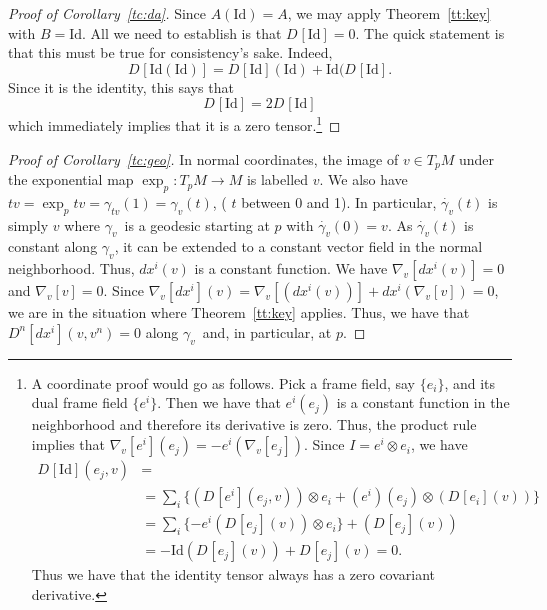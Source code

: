 \documentclass[11pt]{article}
\theoremstyle{remark}
\begin{document}
\begin{proof}[Proof of Corollary~\ref{tc:da}]
Since $A(\ensuremath{\text{Id}}) = A$, we may apply Theorem~\ref{tt:key} with $B=\text{Id}$.  
All we need to establish
is that $\ensuremath{D^{} [{\text{Id}}] {} } =0 $. The quick statement is that this
must be true for consistency's sake. Indeed, 
\[\ensuremath{D^{} [{\ensuremath{\text{Id}}(\ensuremath{\text{Id}})}] {} } = \ensuremath{D^{} [{\ensuremath{\text{Id}}}] ({\ensuremath{\text{Id}}}) } + \ensuremath{\text{Id}}(\ensuremath{D^{} [{\ensuremath{\text{Id}}}] {} }.\]
Since it is the identity, this says that 
\[\ensuremath{D^{} [{\ensuremath{\text{Id}}}] {} } = 2 \ensuremath{D^{} [{\ensuremath{\text{Id}}}] {} }\]
which immediately implies that it is a zero 
tensor.\footnote{A coordinate proof would go as follows. Pick a frame
  field, say 
 $\{e_i\}$,  and its dual frame field $\{e^i\}$. Then we
have that $e^i(e_j)$ is a constant function in the neighborhood and
therefore its 
derivative is zero. Thus, the product rule implies that
$\ensuremath{{{\nabla}}_{v}^{}{[e^i]}}(e_j) = -e^i(\ensuremath{{{\nabla}}_{v}^{}{[e_j]}})$. Since 
 $I = e^i \otimes e_i$, we have 
\begin{align*}
\ensuremath{D^{} [{\ensuremath{\text{Id}}}] ({e_j, v}) } & = \\
& = \sum_i\{ (\ensuremath{D^{} [{e^i}] ({e_j, v}) }) \otimes e_i + 
(e^i)(e_j) \otimes (\ensuremath{D^{} [{e_i}] ({v}) })\} \\
& = \sum_i\{-e^i(\ensuremath{D^{} [{e_j}] ({v}) }) \otimes {e_i}\} +
 (\ensuremath{D^{} [{e_j}] ({v}) }) \\
& = - \ensuremath{\text{Id}}(\ensuremath{D^{} [{e_j}] ({v}) }) + \ensuremath{D^{} [{e_j}] ({v}) } = 0.
\end{align*}
Thus we have that the identity tensor always has a zero covariant
derivative.}
\end{proof}


\begin{proof}[Proof of Corollary~\ref{tc:geo}]
In normal coordinates, the image of $v \in T_p M$ under the
exponential map $\ensuremath{\exp_{p}{}} : T_p M \to M$ is labelled $v$. 
We also have 
$tv = \ensuremath{\exp_{p}{tv}}= \gamma_{tv}(1) = \gamma_{v}(t)$,  
( $t$ between 0 and 1). 
In particular, \ensuremath{{\overset{\cdot}{\gamma}}_{v}({t})} is simply $v$ where \ensuremath{\gamma_v}\ is a geodesic
starting at $p$ with $\ensuremath{{\overset{\cdot}{\gamma}}_{v}({0})} = v$.  
As \ensuremath{{\overset{\cdot}{\gamma}}_{v}({t})} is constant along \ensuremath{\gamma_v}, it can be extended to a
constant vector field in
the normal neighborhood. Thus, $dx^i(v)$ is a constant
function. We have $\ensuremath{{{\nabla}}_{v}^{}{[dx^i(v)]}} = 0 $ and $\ensuremath{{{\nabla}}_{v}^{}{[v]}}
=0$. Since $\ensuremath{{{\nabla}}_{v}^{}{[dx^i]}} (v) =  
\ensuremath{{{\nabla}}_{v}^{}{[(dx^i(v))]}} + dx^i(\ensuremath{{{\nabla}}_{v}^{}{[v]}})=0$, we are in the
situation where Theorem~\ref{tt:key} applies. Thus, we have that
$\ensuremath{D^{n} [{dx^i}] ({v, v^n}) } = 0$ along \ensuremath{\gamma_v}\ and, in particular, at $p$. 
\end{proof}
\end{document}
